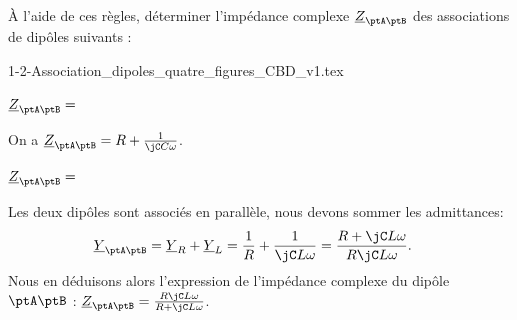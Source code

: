 À l'aide de ces règles, déterminer l'impédance complexe $\underline{Z}_{\ptA\ptB}$ des associations de dipôles suivants : 

\begin{center}
	{1-2-Association_dipoles_quatre_figures_CBD_v1.tex}
\end{center}


\debutEntrainement


\begin{enonce}
	$\underline{Z}_{\ptA\ptB} = $ 
\end{enonce}


\begin{corrige}
On a $\underline{Z}_{\ptA\ptB}=R+\frac{1}{\jC C\omega}$.
\end{corrige}




\begin{enonce}
	$\underline{Z}_{\ptA\ptB} = $ 
\end{enonce}


\begin{corrige}
Les deux dipôles sont associés en parallèle, nous devons sommer les admittances: 
\begin{align*} 
	\underline{Y}_{\ptA\ptB} & =\underline{Y}_{R}+\underline{Y}_{L}  =\frac{1}{R}+\frac{1}{\jC L\omega}  =\frac{R+\jC L\omega}{R\jC L\omega}.
\end{align*}
Nous en déduisons alors l'expression de l'impédance complexe du dipôle $\ptA\ptB$ : $\underline{Z}_{\ptA\ptB}=\frac{R \jC L\omega}{R+\jC L\omega } $.
\end{corrige}




